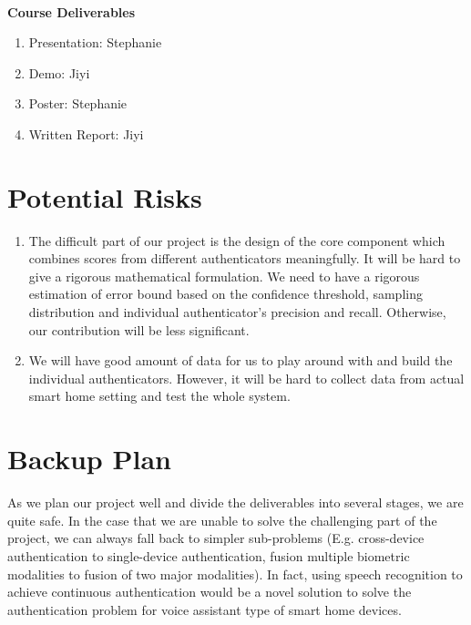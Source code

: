 \documentclass[a4paper, 11pt]{article}
\begin{document}
\noindent\\
{\bf Course Deliverables}
\begin{enumerate}
\item Presentation: Stephanie
\item Demo: Jiyi
\item Poster: Stephanie
\item Written Report: Jiyi
\end{enumerate}

\section*{Potential Risks}
\begin{enumerate}
\item The difficult part of our project is the design of the core component which combines scores from different authenticators meaningfully. It will be hard to give a rigorous mathematical formulation. We need to have a rigorous estimation of error bound based on the confidence threshold, sampling distribution and individual authenticator’s precision and recall. Otherwise, our contribution will be less significant.
\item We will have good amount of data for us to play around with and build the individual authenticators. However, it will be hard to collect data from actual smart home setting and test the whole system.
\end{enumerate}

\section*{Backup Plan}
As we plan our project well and divide the deliverables into several stages, we are quite safe. In the case that we are unable to solve the challenging part of the project, we can always fall back to simpler sub-problems (E.g. cross-device authentication to single-device authentication, fusion multiple biometric modalities to fusion of two major modalities). In fact, using speech recognition to achieve continuous authentication would be a novel solution to solve the authentication problem for voice assistant type of smart home devices.



\end{document}
